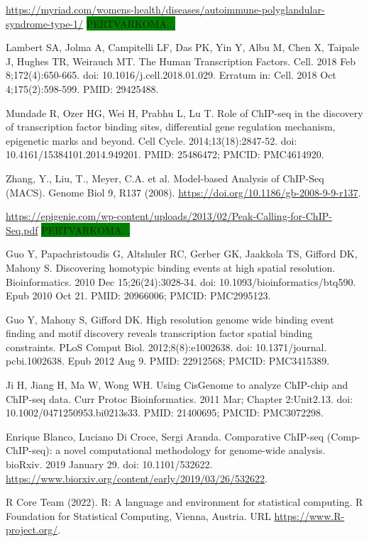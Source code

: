 \documentclass[12pt]{article}
\begin{document}
\begin{thebibliography}{99}
 \url{https://myriad.com/womens-health/diseases/autoimmune-polyglandular-syndrome-type-1/}
\colorbox{green}{PERTVARKOMA...}

 Lambert SA, Jolma A, Campitelli LF, Das PK, Yin Y, Albu M,
Chen X, Taipale J, Hughes TR, Weirauch MT. The Human Transcription Factors.
Cell. 2018 Feb 8;172(4):650-665. doi: 10.1016/j.cell.2018.01.029.
Erratum in: Cell. 2018 Oct 4;175(2):598-599. PMID: 29425488.

 Mundade R, Ozer HG, Wei H, Prabhu L, Lu T. Role of ChIP-seq
in the discovery of transcription factor binding sites, differential gene
regulation mechanism, epigenetic marks and beyond. Cell Cycle.
2014;13(18):2847-52. doi: 10.4161/15384101.2014.949201. PMID: 25486472;
PMCID: PMC4614920.

 Zhang, Y., Liu, T., Meyer, C.A. et al. Model-based Analysis
of ChIP-Seq (MACS). Genome Biol 9, R137 (2008).
\url{https://doi.org/10.1186/gb-2008-9-9-r137}.

 \url{https://epigenie.com/wp-content/uploads/2013/02/Peak-Calling-for-ChIP-Seq.pdf}
\colorbox{green}{PERTVARKOMA...}

 Guo Y, Papachristoudis G, Altshuler RC, Gerber GK, Jaakkola
TS, Gifford DK, Mahony S. Discovering homotypic binding events at high spatial
resolution. Bioinformatics. 2010 Dec 15;26(24):3028-34.
doi: 10.1093/bioinformatics/btq590. Epub 2010 Oct 21. PMID: 20966006;
PMCID: PMC2995123.

 Guo Y, Mahony S, Gifford DK. High resolution genome wide
binding event finding and motif discovery reveals transcription factor spatial
binding constraints. PLoS Comput Biol. 2012;8(8):e1002638. doi: 10.1371/journal.
pcbi.1002638. Epub 2012 Aug 9. PMID: 22912568; PMCID: PMC3415389.

 Ji H, Jiang H, Ma W, Wong WH. Using CisGenome to analyze
ChIP-chip and ChIP-seq data. Curr Protoc Bioinformatics. 2011 Mar;
Chapter 2:Unit2.13. doi: 10.1002/0471250953.bi0213s33. PMID: 21400695;
PMCID: PMC3072298.

 Enrique Blanco, Luciano Di Croce, Sergi Aranda. Comparative
ChIP-seq (Comp-ChIP-seq): a novel computational methodology for genome-wide
analysis. bioRxiv. 2019 January 29. doi: 10.1101/532622. \newline
\url{https://www.biorxiv.org/content/early/2019/03/26/532622}.

 R Core Team (2022). R: A language and environment for statistical
computing. R Foundation for Statistical Computing, Vienna, Austria. URL
\url{https://www.R-project.org/}.


\end{thebibliography}
\end{document}
